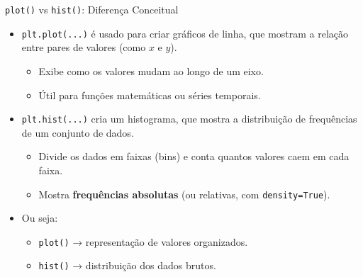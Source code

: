 \begin{frame}{\texttt{plot()} vs \texttt{hist()}: Diferença Conceitual}
    \begin{itemize}
        \item \texttt{plt.plot(...)} é usado para criar gráficos de linha, que mostram a relação entre pares de valores (como \(x\) e \(y\)).
        \begin{itemize}
            \item Exibe como os valores mudam ao longo de um eixo.
            \item Útil para funções matemáticas ou séries temporais.
        \end{itemize}
        \item \texttt{plt.hist(...)} cria um histograma, que mostra a distribuição de frequências de um conjunto de dados.
        \begin{itemize}
            \item Divide os dados em faixas (bins) e conta quantos valores caem em cada faixa.
            \item Mostra \textbf{frequências absolutas} (ou relativas, com \texttt{density=True}).
        \end{itemize}
        \item Ou seja:
        \begin{itemize}
            \item \texttt{plot()} → representação de valores organizados.
            \item \texttt{hist()} → distribuição dos dados brutos.
        \end{itemize}
    \end{itemize}
\end{frame}


